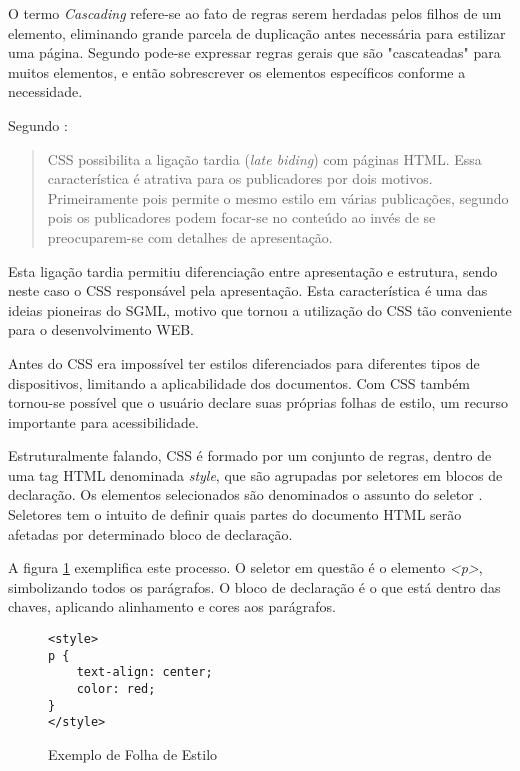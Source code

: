 O termo \textit{Cascading} refere-se ao fato de regras serem
herdadas pelos filhos de um elemento, eliminando grande parcela de
duplicação antes necessária para estilizar uma página. Segundo
\cite{html5mostwanted} pode-se expressar regras gerais que são
"cascateadas" para muitos elementos, e então sobrescrever os elementos
específicos conforme a necessidade.

Segundo \cite[pp. 23--24]{CascadingStyleSheets}:
\begin{quote}
CSS possibilita a ligação tardia (\textit{late biding}) com
páginas HTML. Essa característica é atrativa para os publicadores
por dois motivos. Primeiramente pois permite o mesmo estilo em várias
publicações, segundo pois os publicadores podem focar-se no conteúdo
ao invés de se preocuparem-se com detalhes de apresentação.
\end{quote}

Esta ligação tardia permitiu diferenciação entre apresentação e
estrutura, sendo neste caso o CSS responsável pela apresentação. Esta
característica é uma das ideias pioneiras do SGML, motivo que tornou a
utilização do CSS tão conveniente para o desenvolvimento WEB.

Antes do CSS era impossível ter estilos diferenciados para diferentes
tipos de dispositivos, limitando a aplicabilidade dos documentos.
Com CSS também tornou-se possível que o usuário declare suas próprias
folhas de estilo, um recurso importante para acessibilidade.

Estruturalmente falando, CSS é formado por um conjunto de regras,
dentro de uma tag HTML denominada \textit{style}, que são agrupadas
por seletores em blocos de declaração. Os elementos selecionados são
denominados o assunto do seletor \autocite{cssSelectors}. Seletores tem
o intuito de definir quais partes do documento HTML serão afetadas por
determinado bloco de declaração.

A figura \ref{fig:CSSSample} exemplifica este processo. O seletor em
questão é o elemento \textit{<p>}, simbolizando todos os parágrafos. O bloco de
declaração é o que está dentro das chaves, aplicando alinhamento e
cores aos parágrafos.

\begin{figure}[H]
\centering
\begin{verbatim}
<style>
p {
    text-align: center;
    color: red;
}
</style>
\end{verbatim}
\caption{Exemplo de Folha de Estilo}
\label{fig:CSSSample}
\end{figure}

